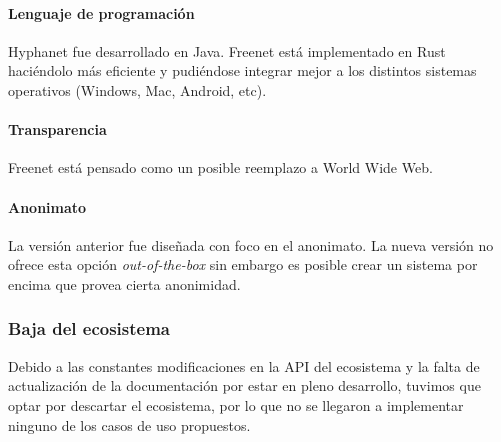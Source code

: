 \paragraph{Lenguaje de programación} Hyphanet fue desarrollado en Java. Freenet está implementado en Rust haciéndolo más eficiente y pudiéndose integrar mejor a los distintos sistemas operativos (Windows, Mac, Android, etc).

\paragraph{Transparencia} Freenet está pensado como un posible reemplazo a World Wide Web.

\paragraph{Anonimato} La versión anterior fue diseñada con foco en el anonimato. La nueva versión no ofrece esta opción \textit{out-of-the-box} sin embargo es posible crear un sistema por encima que provea cierta anonimidad.

\subsubsection{Baja del ecosistema}

Debido a las constantes modificaciones en la API del ecosistema y la falta de actualización de la documentación por estar en pleno desarrollo, tuvimos que optar por descartar el ecosistema, por lo que no se llegaron a implementar ninguno de los casos de uso propuestos.
